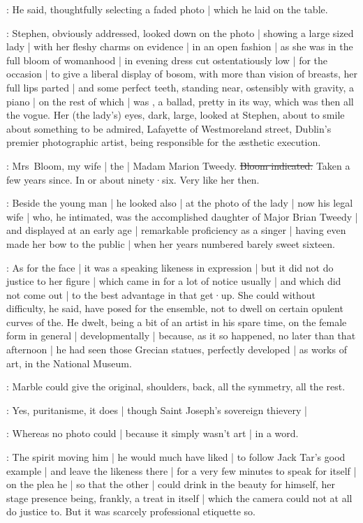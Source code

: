 :
He said,
thoughtfully selecting a faded photo |
which he laid on the table.

:
Stephen,
obviously addressed,
looked down on the photo |
showing a large sized lady |
with her fleshy charms on evidence |
in an open fashion |
as she was in the full bloom of womanhood |
in evening dress cut ostentatiously low |
for the occasion |
to give a liberal display of bosom,
with more than vision of breasts,
her full lips parted |
and some perfect teeth,
standing near,
ostensibly with gravity,
a piano |
on the rest of which |
was ,
a ballad,
pretty in its way,
which was then all the vogue.
Her (the lady's) eyes,
dark,
large,
looked at Stephen,
about to smile about something to be admired,
Lafayette of Westmoreland street,
Dublin's premier photographic artist,
being responsible for the æsthetic execution.

\Bloom:
Mrs~Bloom,
my wife |
the  |
Madam Marion Tweedy.
\sout{Bloom indicated.}
Taken a few years since.
In or about ninety·six.
Very like her then.

:
Beside the young man |
he looked also |
at the photo of the lady |
now his legal wife |
who,
he intimated,
was the accomplished daughter of Major Brian Tweedy |
and displayed at an early age |
remarkable proficiency as a singer |
having even made her bow to the public |
when her years numbered barely sweet sixteen.

:
As for the face |
it was a speaking likeness in expression |
but it did not do justice to her figure |
which came in for a lot of notice usually |
and which did not come out |
to the best advantage in that get·up.
She could without difficulty,
he said,
have posed for the ensemble,
not to dwell on certain opulent curves of the.
He dwelt,
being a bit of an artist in his spare time,
on the female form in general |
developmentally |
because,
as it so happened,
no later than that afternoon |
he had seen those Grecian statues,
perfectly developed |
as works of art,
in the National Museum.

:
Marble could give the original,
shoulders,
back,
all the symmetry,
all the rest.

:
Yes,
puritanisme,
it does |
though Saint Joseph's sovereign thievery |

:
Whereas no photo could |
because it simply wasn't art |
in a word.

:
The spirit moving him |
he would much have liked |
to follow Jack Tar's good example |
and leave the likeness there |
for a very few minutes to speak for itself |
on the plea he |
so that the other |
could drink in the beauty for himself,
her stage presence being,
frankly,
a treat in itself |
which the camera could not at all do justice to.
But it was scarcely professional etiquette so.

